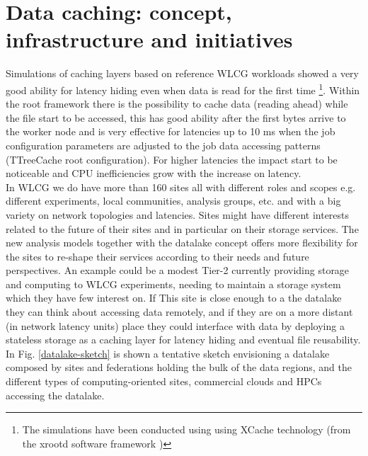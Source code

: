 \section{Data caching: concept, infrastructure and initiatives}
Simulations of caching layers based on reference WLCG workloads showed a very good ability for latency hiding even when data is read for the first time \footnote{The simulations have been conducted using using XCache technology (from the xrootd software framework \cite{xroot})}.
Within the root framework \cite{root} there is the possibility to cache data (reading ahead) while the file start to be accessed, this has good ability after the first bytes arrive to the worker node and is very effective for latencies up to 10 ms when the job configuration parameters are adjusted to the job data accessing patterns (TTreeCache root configuration). For higher latencies the impact start to be noticeable and CPU inefficiencies grow with the increase on latency.\\
In WLCG we do have more than 160 sites all with different roles and scopes e.g. different experiments, local communities, analysis groups, etc. and with a big variety on network topologies and latencies. Sites might have different interests related to the future of their sites and in particular on their storage services. The new analysis models together with the datalake concept offers more flexibility for the sites to re-shape their services according to their needs and future perspectives. An example could be a modest Tier-2 currently providing storage and computing to WLCG experiments, needing to maintain a storage system which they have few interest on. If This site is close enough to a the datalake they can think about accessing data remotely, and if they are on a more distant (in network latency units) place they could interface with data by deploying a stateless storage as a caching layer for latency hiding and eventual file reusability. In Fig. \ref{datalake-sketch} is shown a tentative sketch envisioning a datalake composed by sites and federations holding the bulk of the data regions, and the different types of computing-oriented sites, commercial clouds and HPCs accessing the datalake.\\

